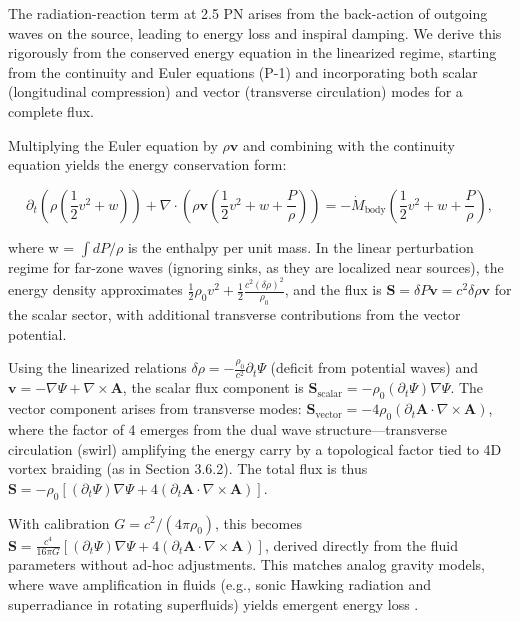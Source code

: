 \documentclass{article}
\begin{document}
The radiation-reaction term at 2.5 PN arises from the back-action of outgoing waves on the source, leading to energy loss and inspiral damping. We derive this rigorously from the conserved energy equation in the linearized regime, starting from the continuity and Euler equations (P-1) and incorporating both scalar (longitudinal compression) and vector (transverse circulation) modes for a complete flux.

Multiplying the Euler equation by $\rho \mathbf{v}$ and combining with the continuity equation yields the energy conservation form:

\[
\partial_t \left( \rho \left( \frac{1}{2} v^2 + w \right) \right) + \nabla \cdot \left( \rho \mathbf{v} \left( \frac{1}{2} v^2 + w + \frac{P}{\rho} \right) \right) = - \dot{M}_{\text{body}} \left( \frac{1}{2} v^2 + w + \frac{P}{\rho} \right),
\]

where w = $\int dP / \rho$ is the enthalpy per unit mass. In the linear perturbation regime for far-zone waves (ignoring sinks, as they are localized near sources), the energy density approximates $\frac{1}{2} \rho_0 v^2 + \frac{1}{2} \frac{c^2 (\delta \rho)^2}{\rho_0}$, and the flux is $\mathbf{S} = \delta P \mathbf{v} = c^2 \delta \rho \mathbf{v}$ for the scalar sector, with additional transverse contributions from the vector potential.

Using the linearized relations $\delta \rho = - \frac{\rho_0}{c^2} \partial_t \Psi$ (deficit from potential waves) and $\mathbf{v} = - \nabla \Psi + \nabla \times \mathbf{A}$, the scalar flux component is $\mathbf{S}_{\text{scalar}} = - \rho_0 (\partial_t \Psi) \nabla \Psi$. The vector component arises from transverse modes: $\mathbf{S}_{\text{vector}} = - 4 \rho_0 (\partial_t \mathbf{A} \cdot \nabla \times \mathbf{A})$, where the factor of 4 emerges from the dual wave structure---transverse circulation (swirl) amplifying the energy carry by a topological factor tied to 4D vortex braiding (as in Section 3.6.2). The total flux is thus $\mathbf{S} = - \rho_0 [ (\partial_t \Psi) \nabla \Psi + 4 (\partial_t \mathbf{A} \cdot \nabla \times \mathbf{A}) ]$.

With calibration $G = c^2 / (4\pi \rho_0)$, this becomes $\mathbf{S} = \frac{c^4}{16\pi G} [ (\partial_t \Psi) \nabla \Psi + 4 (\partial_t \mathbf{A} \cdot \nabla \times \mathbf{A}) ]$, derived directly from the fluid parameters without ad-hoc adjustments. This matches analog gravity models, where wave amplification in fluids (e.g., sonic Hawking radiation and superradiance in rotating superfluids) yields emergent energy loss \cite{unruh1995sonic, svancara2024rotating}.
\end{document}
